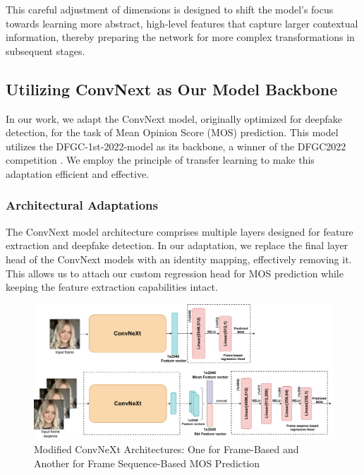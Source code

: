 \documentclass[a4paper,12pt,openright]{book}
\begin{document}
\begin{itemize}
This careful adjustment of dimensions is designed to shift the model's focus towards learning more abstract, high-level features that capture larger contextual information, thereby preparing the network for more complex transformations in subsequent stages.

\end{itemize}

\subsection{Utilizing ConvNext as Our Model Backbone}

In our work, we adapt the ConvNext model, originally optimized for deepfake detection, for the task of Mean Opinion Score (MOS) prediction. This model utilizes the DFGC-1st-2022-model as its backbone, a winner of the DFGC2022 competition \cite{peng2022dfgc}. We employ the principle of transfer learning to make this adaptation efficient and effective.

\subsubsection{Architectural Adaptations}

The ConvNext model architecture comprises multiple layers designed for feature extraction and deepfake detection. In our adaptation, we replace the final layer head of the ConvNext models with an identity mapping, effectively removing it. This allows us to attach our custom regression head for MOS prediction while keeping the feature extraction capabilities intact.

\begin{figure}[h]
\centering
\includegraphics[width=1.1\textwidth]{images/convmy.drawio.pdf}
\caption{Modified ConvNeXt Architectures: One for Frame-Based and Another for Frame Sequence-Based MOS Prediction}\label{fig:modified_convnext}
\end{figure}
\end{document}
